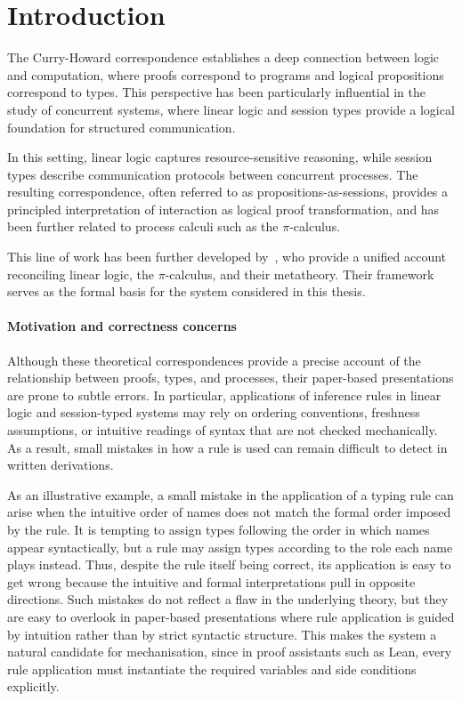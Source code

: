 \section{Introduction}
The Curry-Howard correspondence establishes a deep connection between logic and computation, where proofs correspond to programs and logical propositions correspond to types. This perspective has been particularly influential in the study of concurrent systems, where linear logic and session types provide a logical foundation for structured communication.

In this setting, linear logic captures resource-sensitive reasoning, while session types describe communication protocols between concurrent processes. The resulting correspondence, often referred to as propositions-as-sessions, provides a principled interpretation of interaction as logical proof transformation, and has been further related to process calculi such as the $\pi$-calculus.

This line of work has been further developed by~\citet{abs-2106-11818}, who provide a unified account reconciling linear logic, the $\pi$-calculus, and their metatheory. Their framework serves as the formal basis for the system \pill{} considered in this thesis.

\paragraph{Motivation and correctness concerns}
Although these theoretical correspondences provide a precise account of the relationship between proofs, types, and processes, their paper-based presentations are prone to subtle errors. In particular, applications of inference rules in linear logic and session-typed systems may rely on ordering conventions, freshness assumptions, or intuitive readings of syntax that are not checked mechanically. As a result, small mistakes in how a rule is used can remain difficult to detect in written derivations.

As an illustrative example, a small mistake in the application of a typing rule can arise when the intuitive order of names does not match the formal order imposed by the rule. It is tempting to assign types following the order in which names appear syntactically, but a rule may assign types according to the role each name plays instead. Thus, despite the rule itself being correct, its application is easy to get wrong because the intuitive and formal interpretations pull in opposite directions. Such mistakes do not reflect a flaw in the underlying theory, but they are easy to overlook in paper-based presentations where rule application is guided by intuition rather than by strict syntactic structure. This makes the system a natural candidate for mechanisation, since in proof assistants such as Lean, every rule application must instantiate the required variables and side conditions explicitly.

